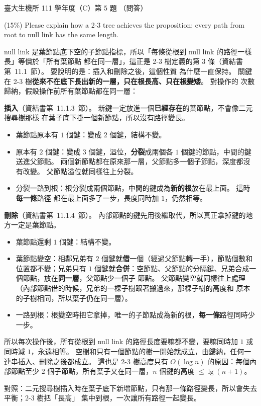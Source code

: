 \begin{pastexam}[label={px:ntu-111-bime-ds-05}]{臺大生機所 111 學年度（C）第 5 題}
（問答）

(15\%) Please explain how a 2-3 tree achieves the proposition: every path from root to null link
has the same length.
\end{pastexam}

\begin{pastsoln}
null link 是葉節點底下空的子節點指標，所以「每條從根到 null link 的路徑一樣長」等價於「所有葉節點
都在同一層」，這正是 2-3 樹定義的第 3 條（資結書第~11.1~節）。 要說明的是：插入和刪除之後，這個性質
為什麼一直保持。 關鍵在 2-3 樹\textbf{從來不在底下長出新的一層，只在根長高、只在根變矮}。 對操作的
次數歸納，假設操作前所有葉節點都在同一層：

\textbf{插入}（資結書第~11.1.3~節）。 新鍵一定放進一個\textbf{已經存在}的葉節點，不會像二元搜尋樹那樣
在葉子底下掛一個新節點，所以沒有路徑變長。
\begin{itemize}
\item 葉節點原本有 $1$ 個鍵：變成 $2$ 個鍵，結構不變。
\item 原本有 $2$ 個鍵：變成 $3$ 個鍵，溢位，\textbf{分裂}成兩個各 $1$ 個鍵的節點，中間的鍵送進父節點。
兩個新節點都在原來那一層，父節點多一個子節點，深度都沒有改變。 父節點溢位就同樣往上分裂。
\item 分裂一路到根：根分裂成兩個節點，中間的鍵成為\textbf{新的根}放在最上面。 這時\textbf{每一條}路徑
都在最上面多了一步，長度同時加 $1$，仍然相等。
\end{itemize}

\textbf{刪除}（資結書第~11.1.4~節）。 內部節點的鍵先用後繼取代，所以真正拿掉鍵的地方一定是葉節點。
\begin{itemize}
\item 葉節點還剩 $1$ 個鍵：結構不變。
\item 葉節點變空：相鄰兄弟有 $2$ 個鍵就\textbf{借}一個（經過父節點轉一手），節點個數和位置都不變；兄弟只有
$1$ 個鍵就\textbf{合併}：空節點、父節點的分隔鍵、兄弟合成一個節點，放在\textbf{同一層}，父節點少一個子
節點。 父節點變空就同樣往上處理（內部節點借的時候，兄弟的一棵子樹跟著搬過來，那棵子樹的高度和
原本的子樹相同，所以葉子仍在同一層）。
\item 一路到根：根變空時把它拿掉，唯一的子節點成為新的根，\textbf{每一條}路徑同時少一步。
\end{itemize}

所以每次操作後，所有從根到 null link 的路徑長度要嘛都不變，要嘛同時加 $1$ 或同時減 $1$，永遠相等。
空樹和只有一個節點的樹一開始就成立，由歸納，任何一連串插入、刪除之後都成立。 這也是 2-3 樹高度只有
$O(\log n)$ 的原因：每個內部節點至少 $2$ 個子節點，所有葉子又在同一層，$n$ 個鍵的高度 $\le \lg(n+1)$。

對照：二元搜尋樹插入時在葉子底下新增節點，只有那一條路徑變長，所以會失去平衡；2-3 樹把「長高」
集中到根，一次讓所有路徑一起變長。
\end{pastsoln}
